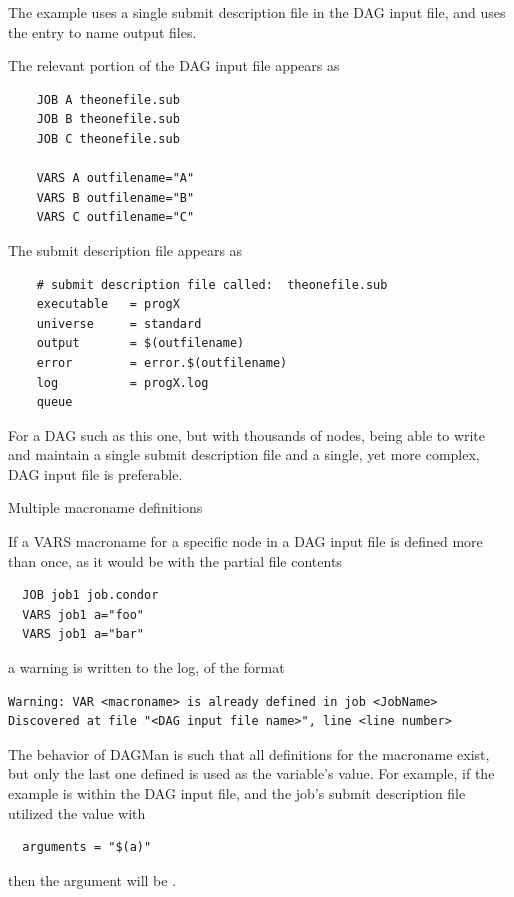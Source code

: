 The example uses a single submit description file in the DAG input
file, and uses the  entry to name output files.

The relevant portion of the DAG input file appears as 
\begin{verbatim}
    JOB A theonefile.sub
    JOB B theonefile.sub
    JOB C theonefile.sub

    VARS A outfilename="A"
    VARS B outfilename="B"
    VARS C outfilename="C"
\end{verbatim}

The submit description file appears as 
\footnotesize
\begin{verbatim}
    # submit description file called:  theonefile.sub
    executable   = progX
    universe     = standard
    output       = $(outfilename)
    error        = error.$(outfilename)
    log          = progX.log
    queue
\end{verbatim}
\normalsize

For a DAG such as this one, but with thousands of nodes,
being able to write and maintain a single submit description file 
and a single, yet more complex, DAG input file is preferable.

\begin{description}
\item[Multiple macroname definitions]
\end{description}

If a VARS macroname for a specific node in a DAG input file is defined
more than once,
as it would be with the partial file contents
\begin{verbatim}
  JOB job1 job.condor
  VARS job1 a="foo"
  VARS job1 a="bar"
\end{verbatim}
a warning is written to the log, of the format 
\begin{verbatim}
Warning: VAR <macroname> is already defined in job <JobName>
Discovered at file "<DAG input file name>", line <line number>
\end{verbatim}

The behavior of DAGMan is such that all definitions for the macroname
exist,
but only the last one defined is used as the variable's value.
For example, if the example is within the DAG input file,
and the job's submit description file utilized the value with
\begin{verbatim}
  arguments = "$(a)"
\end{verbatim}
then the argument will be .

